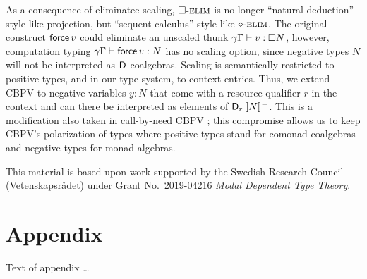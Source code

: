 \documentclass[acmsmall,review,anonymous]{acmart}\settopmatter{printfolios=true,printccs=false,printacmref=false}
\begin{document}
As a consequence of eliminatee scaling, $\relim\Box$ is no longer
``natural-deduction'' style like projection, but ``sequent-calculus''
style like $\relim\diamond$.  The original construct $\force v$ could
eliminate an unscaled thunk $\qValTy \gamma \Gamma v {\Box N}$,
however, computation typing $\qCompTy \gamma \Gamma {\force v} N$ has
no scaling option, since negative types $N$ will not be interpreted as
$\D$-coalgebras.  Scaling is semantically restricted to positive
types, and in our type system, to context entries.  Thus, we extend
CBPV to negative variables $y : N$ that come with a resource qualifier
$r$ in the context and can there be interpreted as elements of
$\D[r]\,\denn N$.  This is a modification also taken in call-by-need
CBPV \citep{mcDermottMycroft:esop19}; this compromise allows us to
keep CBPV's polarization of types where positive types stand for
comonad coalgebras and negative types for monad algebras.





\begin{acks}                            %

  This material is based upon work supported by the
  Swedish Research Council (Vetenskapsrådet)
  under Grant
  No.~2019-04216 \emph{Modal Dependent Type Theory}.

\end{acks}





\appendix
\section{Appendix}

Text of appendix \ldots
\end{document}
